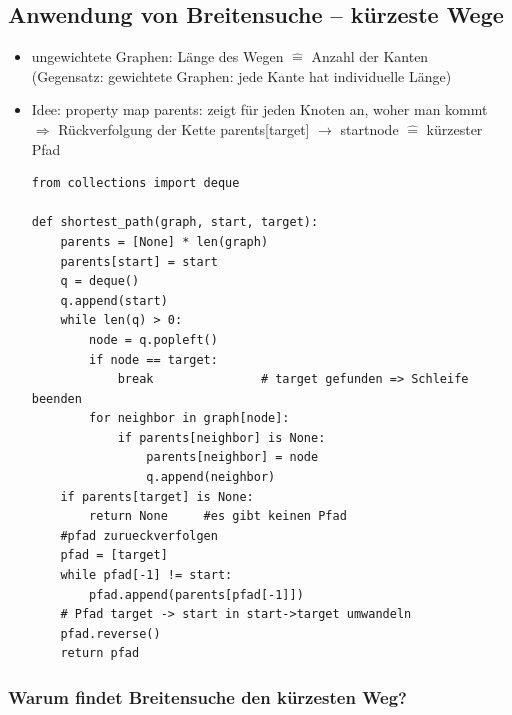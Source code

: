 \documentclass[11pt, fleqn]{scrreprt}
\begin{document}
    \subsection*{Anwendung von Breitensuche – kürzeste Wege}
    \begin{itemize}
        \item ungewichtete Graphen: Länge des Wegen $\widehat{=}$ Anzahl der Kanten \\
        (Gegensatz: gewichtete Graphen: jede Kante hat individuelle Länge)
        \item Idee: property map parents: zeigt für jeden Knoten an, woher man kommt \\
        $\Rightarrow$ Rückverfolgung der Kette parents[target] $\rightarrow$ startnode $\widehat{=}$ kürzester Pfad
        \begin{verbatim}
from collections import deque

def shortest_path(graph, start, target):
    parents = [None] * len(graph)
    parents[start] = start
    q = deque()
    q.append(start)
    while len(q) > 0:
        node = q.popleft()
        if node == target:
            break               # target gefunden => Schleife beenden
        for neighbor in graph[node]:
            if parents[neighbor] is None:
                parents[neighbor] = node
                q.append(neighbor)
    if parents[target] is None:
        return None     #es gibt keinen Pfad
    #pfad zurueckverfolgen
    pfad = [target]
    while pfad[-1] != start:
        pfad.append(parents[pfad[-1]])
    # Pfad target -> start in start->target umwandeln
    pfad.reverse()
    return pfad
        \end{verbatim}
    \end{itemize}

    \subsubsection*{Warum findet Breitensuche den kürzesten Weg?}
\end{document}
